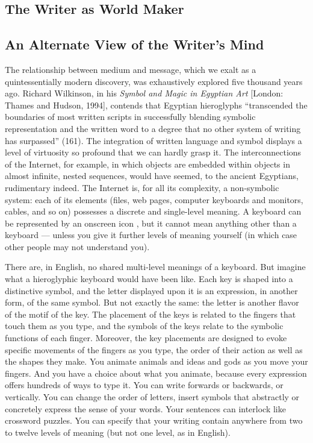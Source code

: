 \documentclass[letterpaper,oneside]{memoir}
\begin{document}
\begin{description}
\section{The Writer as World Maker}
\subsection{An Alternate View of the Writer's Mind}
The relationship between medium and message, which we exalt as a quintessentially modern discovery, was exhaustively explored five thousand years ago. Richard Wilkinson, in his \textit{Symbol and Magic in Egyptian Art} [London: Thames and Hudson, 1994], contends that Egyptian hieroglyphs ``transcended the boundaries of most written scripts in successfully blending symbolic representation and the written word to a degree that no other system of writing has surpassed'' (161). The integration of written language and symbol displays a level of virtuosity so profound that we can hardly grasp it. The interconnections of the Internet, for example, in which objects are embedded within objects in almost infinite, nested sequences, would have seemed, to the ancient Egyptians, rudimentary indeed. The Internet is, for all its complexity, a non-symbolic system: each of its elements (files, web pages, computer keyboards and monitors, cables, and so on) possesses a discrete and single-level meaning. A keyboard can be represented by an onscreen icon , but it cannot mean anything other than a keyboard --- unless you give it further levels of meaning yourself (in which case other people may not understand you).

There are, in English, no shared multi-level meanings of a keyboard. But imagine what a hieroglyphic keyboard would have been like. Each key is shaped into a distinctive symbol, and the letter displayed upon it is an expression, in another form, of the same symbol. But not exactly the same: the letter is another flavor of the motif of the key. The placement of the keys is related to the fingers that touch them as you type, and the symbols of the keys relate to the symbolic functions of each finger. Moreover, the key placements are designed to evoke specific movements of the fingers as you type, the order of their action as well as the shapes they make. You animate animals and ideas and gods as you move your fingers. And you have a choice about what you animate, because every expression offers hundreds of ways to type it. You can write forwards or backwards, or vertically. You can change the order of letters, insert symbols that abstractly or concretely express the sense of your words. Your sentences can interlock like crossword puzzles. You can specify that your writing contain anywhere from two to twelve levels of meaning (but not one level, as in English).


\end{description}
\end{document}
